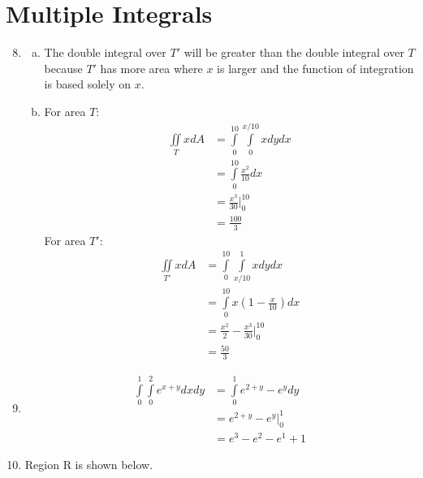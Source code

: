 \documentclass{article}
\begin{document}
\section{Multiple Integrals}

\begin{enumerate}[1.]
  \setcounter{enumi}{7}
  \item \begin{enumerate}[a.]
      \item The double integral over $T'$ will be greater than the double integral
        over $T$ because $T'$ has more area where $x$ is larger and the function
        of integration is based solely on $x$.
      \item For area $T$:
        \begin{align*}
          \iint\limits_{T} x dA &= \int\limits_{0}^{10}\int\limits_{0}^{x/10} x dy
          dx \\
          &= \int\limits_{0}^{10} \frac{ x^{2} }{ 10 } dx \\
          &= \frac{ x^{3} }{ 30 } \bigg\vert_{0}^{10} \\
          &= \frac{ 100 }{ 3 }
        \end{align*}
        For area $T'$:
        \begin{align*}
          \iint\limits_{T'} x dA &= \int \limits_{0}^{10}\int\limits_{x/10}^{1} x
          dy dx \\
          &= \int\limits_{0}^{10} x\left(1 - \frac{ x }{ 10 }\right) dx \\
          &= \frac{ x^{2} }{ 2 } - \frac{ x^{3} }{ 30 } \bigg\vert_{0}^{10} \\
          &= \frac{ 50 }{ 3 }
        \end{align*}
    \end{enumerate}

  \item \begin{align*}
      \int\limits_{0}^{1}\int\limits_{0}^{2} e^{x + y} dx dy &=
      \int\limits_{0}^{1} e^{2+y} - e^{y} dy \\
      &= e^{2 + y} - e^{y} \bigg\vert_{0}^{1} \\
      &= e^{3} - e^{2} - e^{1} + 1
    \end{align*}

  \item Region R is shown below.


\end{enumerate}
\end{document}
